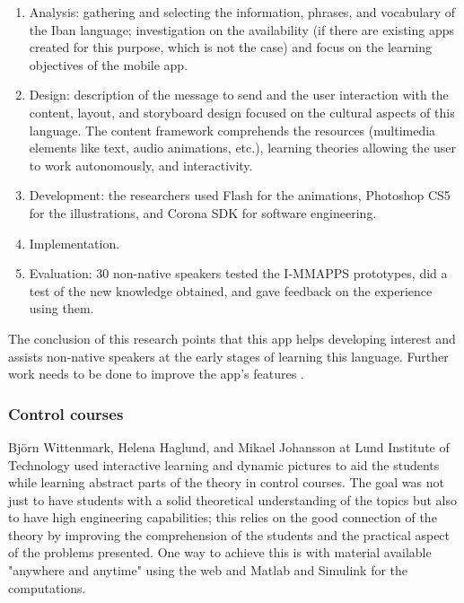 \begin{enumerate}
    \item Analysis: gathering and selecting the information, phrases, and vocabulary of the Iban language; investigation on the availability (if there are existing apps created for this purpose, which is not the case) and focus on the learning objectives of the mobile app.
    \item Design: description of the message to send and the user interaction with the content, layout, and storyboard design focused on the cultural aspects of this language. The content framework comprehends the resources (multimedia elements like text, audio animations, etc.), learning theories allowing the user to work autonomously, and interactivity.
    
    \item Development: the researchers used Flash for the animations, Photoshop CS5  for the illustrations, and Corona SDK for software engineering. 

    
    \item Implementation.
    
    \item Evaluation: 30 non-native speakers tested the I-MMAPPS prototypes, did a test of the new knowledge obtained, and gave feedback on the experience using them.
    
\end{enumerate}

The conclusion of this research points that this app helps developing interest and assists non-native speakers at the early stages of learning this language. Further work needs to be done to improve the app's features \cite{CHACHIL2015267}. 



\subsubsection{Control courses}
Björn Wittenmark, Helena Haglund, and Mikael Johansson at Lund Institute of Technology used interactive learning and dynamic pictures to aid the students while learning abstract parts of the theory in control courses. The goal was not just to have students with a solid theoretical understanding of the topics but also to have high engineering capabilities; this relies on the good connection of the theory by improving the comprehension of the students and the practical aspect of the problems presented. One way to achieve this is with material available "anywhere and anytime" using the web and Matlab and Simulink for the computations. 


